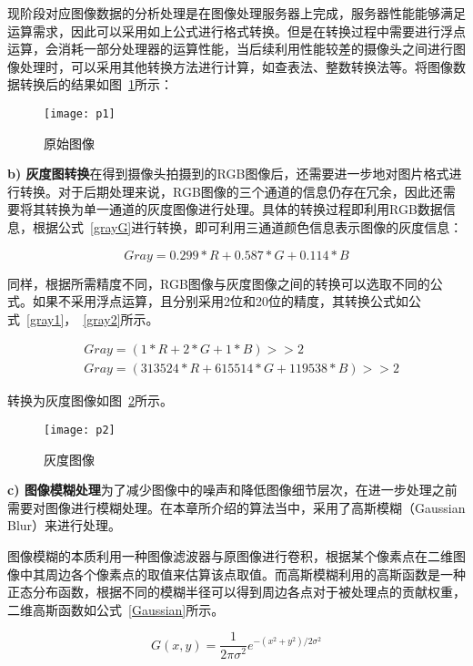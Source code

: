现阶段对应图像数据的分析处理是在图像处理服务器上完成，服务器性能能够满足运算需求，因此可以采用如上公式进行格式转换。但是在转换过程中需要进行浮点运算，会消耗一部分处理器的运算性能，当后续利用性能较差的摄像头之间进行图像处理时，可以采用其他转换方法进行计算，如查表法、整数转换法等。将图像数据转换后的结果如图~\ref{p1}所示：

\begin{figure}[H] 
  \centering
  \texttt{[image: p1]}
  \caption{原始图像}
  \label{p1}
\end{figure}

\textbf{b) 灰度图转换}在得到摄像头拍摄到的RGB图像后，还需要进一步地对图片格式进行转换。对于后期处理来说，RGB图像的三个通道的信息仍存在冗余，因此还需要将其转换为单一通道的灰度图像进行处理。具体的转换过程即利用RGB数据信息，根据公式~\ref{grayG}进行转换，即可利用三通道颜色信息表示图像的灰度信息：

\begin{equation}
Gray = 0.299 * R + 0.587 * G + 0.114 * B
  \label{grayG}
\end{equation}

同样，根据所需精度不同，RGB图像与灰度图像之间的转换可以选取不同的公式。如果不采用浮点运算，且分别采用2位和20位的精度，其转换公式如公式~\ref{gray1}，~\ref{gray2}所示。

\begin{align}
& Gray = (1 * R + 2 * G + 1 * B) >> 2
  \label{gray1} \\
& Gray = (313524 * R + 615514 * G + 119538 * B) >> 2
  \label{gray2}
\end{align}

转换为灰度图像如图~\ref{p2}所示。

\begin{figure}[h] 
  \centering
  \texttt{[image: p2]}
  \caption{灰度图像}
  \label{p2}
\end{figure}

\textbf{c) 图像模糊处理}为了减少图像中的噪声和降低图像细节层次，在进一步处理之前需要对图像进行模糊处理。在本章所介绍的算法当中，采用了高斯模糊（Gaussian Blur）来进行处理。

图像模糊的本质利用一种图像滤波器与原图像进行卷积，根据某个像素点在二维图像中其周边各个像素点的取值来估算该点取值。而高斯模糊利用的高斯函数是一种正态分布函数，根据不同的模糊半径可以得到周边各点对于被处理点的贡献权重，二维高斯函数如公式~\ref{Gaussian}所示。

\begin{equation}
G(x,y) = \frac{1}{2 \pi \sigma^2}e^{-(x^2+y^2)/2\sigma ^2}
  \label{Gaussian}
\end{equation}

